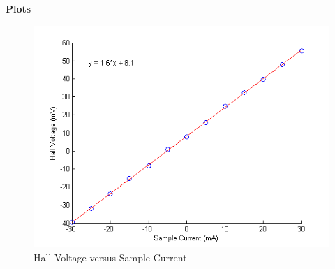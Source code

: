 \documentclass[a4paper,12pt]{article}
\begin{document}
\newpage
\textbf{{\LARGE Plots}}
\begin{figure}[h!]
\centering
\includegraphics[scale = 0.60]{"Sample Current plot"}
\caption{Hall Voltage versus Sample Current}
\label{fig:SampleCurrentplot}
\end{figure}
\end{document}
